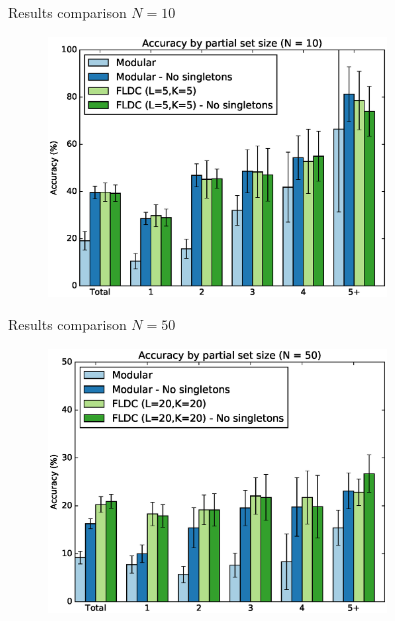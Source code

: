 \documentclass{beamer}
\begin{document}
\begin{frame}{Results comparison $N = 10$}
  \begin{figure}
    \centering
    \includegraphics[width=0.8\textwidth]{set_size_score_10_no_singletons}
  \end{figure}
\end{frame}

\begin{frame}{Results comparison $N = 50$}
  \begin{figure}
    \centering
    \includegraphics[width=0.8\textwidth]{set_size_score_50_no_singletons}
  \end{figure}
\end{frame}
\end{document}
